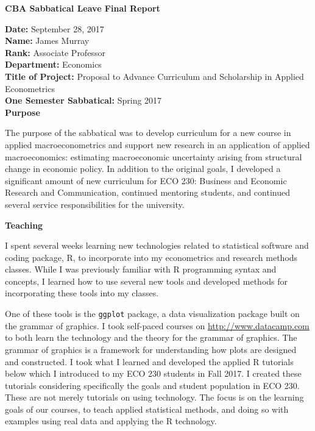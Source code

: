 \documentclass[11pt]{article}
\begin{document}
\thispagestyle{empty}

\begin{center}
\textbf{CBA Sabbatical Leave Final Report}\\
\end{center}

\noindent \textbf{Date:} September 28, 2017\\
\noindent \textbf{Name:} James Murray \\
\noindent \textbf{Rank:} Associate Professor\\ 
\noindent \textbf{Department:} Economics\\
\noindent \textbf{Title of Project:} Proposal to Advance Curriculum and Scholarship in Applied Econometrics  \\
\noindent \textbf{One Semester Sabbatical:} Spring 2017 \\

\textbf{Purpose}

The purpose of the sabbatical was to develop curriculum for a new course in applied macroeconometrics and support new research in an application of applied macroeconomics: estimating macroeconomic uncertainty arising from structural change in economic policy. In addition to the original goals, I developed a significant amount of new curriculum for ECO 230: Business and Economic Research and Communication, continued mentoring students, and continued several service responsibilities for the university.

\textbf{Teaching}

I spent several weeks learning new technologies related to statistical software and coding package, R, to incorporate into my econometrics and research methods classes. While I was previously familiar with R programming syntax and concepts, I learned how to use several new tools and developed methods for incorporating these tools into my classes.

One of these tools is the \texttt{ggplot} package, a data visualization package built on the grammar of graphics.  I took self-paced courses on \url{http://www.datacamp.com} to both learn the technology and the theory for the grammar of graphics. The grammar of graphics is a framework for understanding how plots are designed and constructed.  I took what I learned and developed the applied R tutorials below which I introduced to my ECO 230 students in Fall 2017. I created these tutorials considering specifically the goals and student population in ECO 230. These are not merely tutorials on using technology. The focus is on the learning goals of our courses, to teach applied statistical methods, and doing so with examples using real data and applying the R technology.
\end{document}
